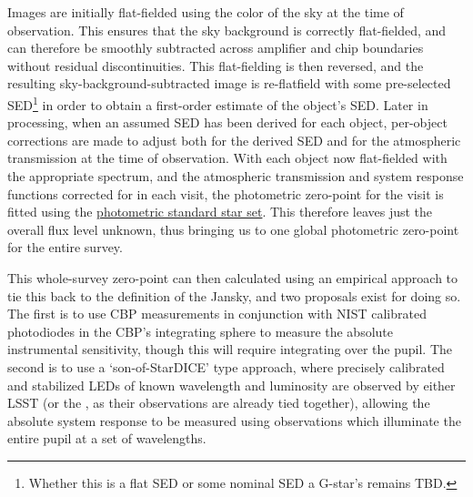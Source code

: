 Images are initially flat-fielded using the color of the sky at the time of observation. This ensures that the sky background is correctly flat-fielded, and can therefore be smoothly subtracted across amplifier and chip boundaries without residual discontinuities. This flat-fielding is then reversed, and the resulting sky-background-subtracted image is re-flatfield with some pre-selected SED\footnote{Whether this is a flat SED or some nominal SED \eg a G-star's remains TBD.} in order to obtain a first-order estimate of the object's SED. Later in processing, when an assumed SED has been derived for each object, per-object corrections are made to adjust both for the derived SED and for the atmospheric transmission at the time of observation.
With each object now flat-fielded with the appropriate spectrum, and the atmospheric transmission and system response functions corrected for in each visit, the photometric zero-point for the visit is fitted using the \hyperref[sec:CPP:output:spectrophotometricStandards]{photometric standard star set}. This therefore leaves just the overall flux level unknown, thus bringing us to one global photometric zero-point for the entire survey.


This whole-survey zero-point can then calculated using an empirical approach to tie this back to the definition of the Jansky, and two proposals exist for doing so. The first is to use CBP measurements in conjunction with NIST calibrated photodiodes in the CBP's integrating sphere to measure the absolute instrumental sensitivity, though this will require integrating over the pupil. The second is to use a `son-of-StarDICE' type approach, where precisely calibrated and stabilized LEDs of known wavelength and luminosity are observed by either LSST (or the \auxtelescope, as their observations are already tied together), allowing the absolute system response to be measured using observations which illuminate the entire pupil at a set of wavelengths.

















